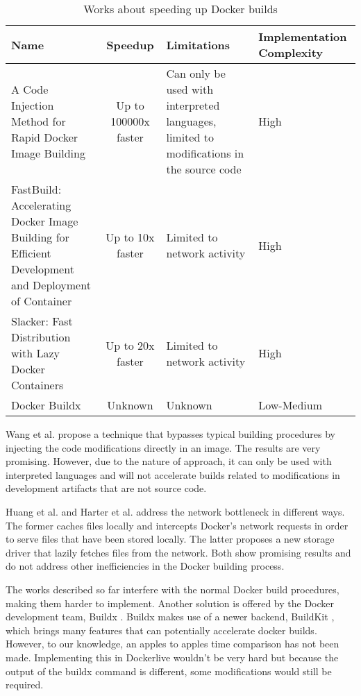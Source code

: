 \begin{table}[H]
    \centering
    \begin{tabular}{|p{}|c|p{}|p{}|}
        \hline \textbf{Name} & \textbf{Speedup} & \textbf{Limitations} & \textbf{Implementation Complexity} \\
        \hline A Code Injection Method for Rapid Docker Image Building \cite{wangCodeInjectionMethod2019} & Up to 100000x faster & Can only be used with interpreted languages, limited to modifications in the source code & High \\
        \hline FastBuild: Accelerating Docker Image Building for Efficient Development and Deployment of Container \cite{huangFastBuildAcceleratingDocker2019} & Up to 10x faster & Limited to network activity & High \\
        \hline Slacker: Fast Distribution with Lazy Docker Containers \cite{harterSlackerFastDistribution} & Up to 20x faster & Limited to network activity & High \\
        \hline Docker Buildx \cite{DockerBuildx2022} & Unknown & Unknown & Low-Medium \\
        \hline
    \end{tabular} 
    \caption{Works about speeding up Docker builds}
    \label{tab:works_speeding_up}
\end{table}

Wang et al. \cite{wangCodeInjectionMethod2019} propose a technique that bypasses typical building procedures by injecting the code modifications directly in an image. The results are very promising. However, due to the nature of approach, it can only be used with interpreted languages and will not accelerate builds related to modifications in development artifacts that are not source code.

Huang et al. \cite{huangFastBuildAcceleratingDocker2019} and Harter et al. \cite{harterSlackerFastDistribution} address the network bottleneck in different ways. The former caches files locally and intercepts Docker's network requests in order to serve files that have been stored locally. The latter proposes a new storage driver that lazily fetches files from the network. Both show promising results and do not address other inefficiencies in the Docker building process.

The works described so far interfere with the normal Docker build procedures, making them harder to implement. Another solution is offered by the Docker development team, Buildx \cite{DockerBuildx2022}. Buildx makes use of a newer backend, BuildKit \cite{BuildKit2022}, which brings many features that can potentially accelerate docker builds. However, to our knowledge, an apples to apples time comparison has not been made. Implementing this in Dockerlive wouldn't be very hard but because the output of the buildx command is different, some modifications would still be required.

